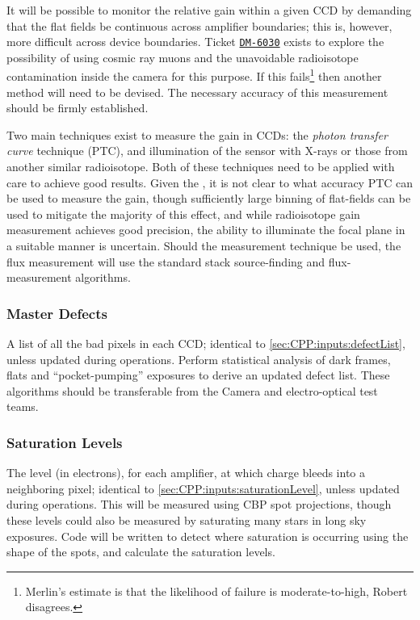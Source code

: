 It will be possible to monitor the relative gain within a given CCD by demanding that the flat fields be continuous across amplifier boundaries; this is, however, more difficult across device boundaries. Ticket \hyperref{https://jira.lsstcorp.org/browse/DM-6030}{}{}{\texttt{DM-6030}} exists to explore the possibility of using cosmic ray muons and the unavoidable radioisotope contamination inside the camera for this purpose. If this fails\footnote{ Merlin's estimate is that the likelihood of failure is moderate-to-high, Robert disagrees.} then another method will need to be devised. The necessary accuracy of this measurement should be firmly established.

Two main techniques exist to measure the gain in CCDs: the \emph{photon transfer curve} technique (PTC), and illumination of the sensor with \fefiftyfive X-rays or those from another similar radioisotope. Both of these techniques need to be applied with care to achieve good results. Given the \bfeffect, it is not clear to what accuracy PTC can be used to measure the gain, though sufficiently large binning of flat-fields can be used to mitigate the majority of this effect, and while radioisotope gain measurement achieves good precision, the ability to illuminate the focal plane in a suitable manner is uncertain. Should the \fefiftyfive measurement technique be used, the flux measurement will use the standard stack source-finding and flux-measurement algorithms.



\subsubsection{Master Defects}\label{sec:CPP:output:defectList}
A list of all the bad pixels in each CCD; identical to \secsymbol\ref{sec:CPP:inputs:defectList}, unless updated during operations.
\alg Perform statistical analysis of dark frames, flats and ``pocket-pumping'' exposures to derive an updated defect list. These algorithms should be transferable from the Camera and electro-optical test teams.


\subsubsection{Saturation Levels}\label{sec:CPP:output:saturationLevel}
The level (in electrons), for each amplifier, at which charge bleeds into a neighboring pixel; identical to \secsymbol\ref{sec:CPP:inputs:saturationLevel}, unless updated during operations.
\alg This will be measured using CBP spot projections, though these levels could also be measured by saturating many stars in long sky exposures. Code will be written to detect where saturation is occurring using the shape of the spots, and calculate the saturation levels.


